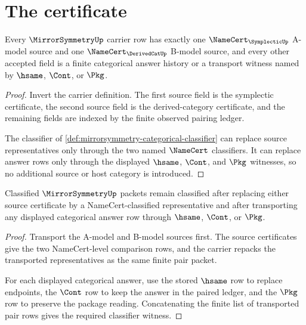 \section{The certificate}
\label{sec:mirrorsymmetry-certificate}

\begin{theorem}
\label{thm:mirrorsymmetry-source-certificate-scope}
Every $\MirrorSymmetryUp$ carrier row has exactly one $\NameCert_{\SymplecticUp}$ A-model source and one $\NameCert_{\DerivedCatUp}$ B-model source, and every other accepted field is a finite categorical answer history or a transport witness named by $\hsame$, $\Cont$, or $\Pkg$.
\end{theorem}
\begin{proof}
Invert the carrier definition. The first source field is the symplectic certificate, the second source field is the derived-category certificate, and the remaining fields are indexed by the finite observed pairing ledger.

The classifier of \autoref{def:mirrorsymmetry-categorical-classifier} can replace source representatives only through the two named $\NameCert$ classifiers. It can replace answer rows only through the displayed $\hsame$, $\Cont$, and $\Pkg$ witnesses, so no additional source or host category is introduced.
\end{proof}

\begin{theorem}
\label{thm:mirrorsymmetry-categorical-stability}
Classified $\MirrorSymmetryUp$ packets remain classified after replacing either source certificate by a NameCert-classified representative and after transporting any displayed categorical answer row through $\hsame$, $\Cont$, or $\Pkg$.
\end{theorem}
\begin{proof}
Transport the A-model and B-model sources first. The source certificates give the two NameCert-level comparison rows, and the carrier repacks the transported representatives as the same finite pair packet.

For each displayed categorical answer, use the stored $\hsame$ row to replace endpoints, the $\Cont$ row to keep the answer in the paired ledger, and the $\Pkg$ row to preserve the package reading. Concatenating the finite list of transported pair rows gives the required classifier witness.
\end{proof}

